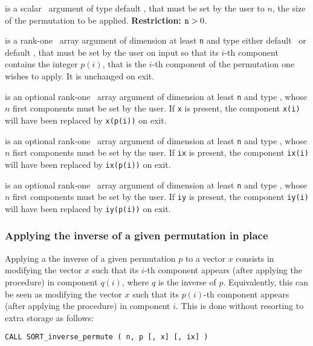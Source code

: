 \documentclass{galahad}
\newcommand{\packagename}{SORT}
\begin{document}
\begin{description}
 is a scalar \intentin\ argument of type default
\integer, that must be set by the user to $n$, the size of the permutation to
be applied.
{\bf Restriction:} ${\tt n} > 0$.

 is a rank-one \intentinout\ array argument of
dimension at least {\tt n} and type either default
\integer\ or default \realdp, that must be set by the user
on input so that its $i$-th component contains the integer $p(i)$, that is the
$i$-th component of the permutation one wishes to apply.
It is unchanged on exit.

 is an optional rank-one \intentinout\ array argument of
dimension at least {\tt n} and type \realdp, whose $n$ first components must
be set by the user. If {\tt x} is present, the component {\tt x(i)} will have
been replaced by {\tt x(p(i))} on exit.

 is an optional rank-one \intentinout\ array argument of
dimension at least {\tt n} and type \integer, whose $n$ fisrt components must
be set by the user. If {\tt ix} is present, the component {\tt ix(i)} will have
been replaced by {\tt ix(p(i))} on exit.

 is an optional rank-one \intentinout\ array argument of
dimension at least {\tt n} and type \integer, whose $n$ first components must
be set by the user. If {\tt iy} is present, the component {\tt iy(i)} will have
been replaced by {\tt iy(p(i))} on exit.
\end{description}

\subsubsection{Applying the inverse of a given permutation in place}

Applying a the inverse of a given permutation $p$ to a vector $x$ consists in
modifying the vector $x$ such that its $i$-th component appears (after
applying the procedure) in component $q(i)$, where $q$ is the inverse of
$p$. Equivalently, this can be seen as modifying the vector $x$ such that its
$p(i)$-th component appears (after applying the procedure) in component $i$.
This is done without resorting to extra storage as follows:
\vspace*{1mm}

{\tt CALL \packagename\_inverse\_permute ( n, p [, x] [, ix] )}
\end{document}
